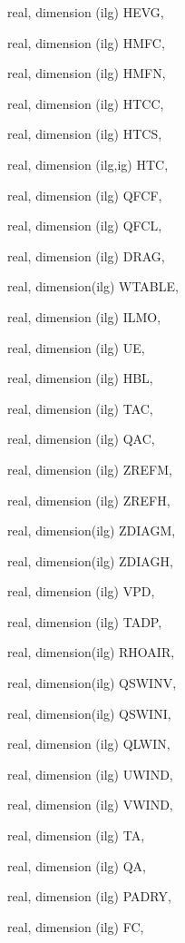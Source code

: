 {\begin{DoxyParamCaption}
\item[{real, dimension  (ilg)}]{H\+E\+V\+G, }
\item[{real, dimension  (ilg)}]{H\+M\+F\+C, }
\item[{real, dimension  (ilg)}]{H\+M\+F\+N, }
\item[{real, dimension  (ilg)}]{H\+T\+C\+C, }
\item[{real, dimension  (ilg)}]{H\+T\+C\+S, }
\item[{real, dimension   (ilg,ig)}]{H\+T\+C, }
\item[{real, dimension  (ilg)}]{Q\+F\+C\+F, }
\item[{real, dimension  (ilg)}]{Q\+F\+C\+L, }
\item[{real, dimension  (ilg)}]{D\+R\+A\+G, }
\item[{real, dimension(ilg)}]{W\+T\+A\+B\+L\+E, }
\item[{real, dimension  (ilg)}]{I\+L\+M\+O, }
\item[{real, dimension    (ilg)}]{U\+E, }
\item[{real, dimension   (ilg)}]{H\+B\+L, }
\item[{real, dimension   (ilg)}]{T\+A\+C, }
\item[{real, dimension   (ilg)}]{Q\+A\+C, }
\item[{real, dimension (ilg)}]{Z\+R\+E\+F\+M, }
\item[{real, dimension (ilg)}]{Z\+R\+E\+F\+H, }
\item[{real, dimension(ilg)}]{Z\+D\+I\+A\+G\+M, }
\item[{real, dimension(ilg)}]{Z\+D\+I\+A\+G\+H, }
\item[{real, dimension   (ilg)}]{V\+P\+D, }
\item[{real, dimension  (ilg)}]{T\+A\+D\+P, }
\item[{real, dimension(ilg)}]{R\+H\+O\+A\+I\+R, }
\item[{real, dimension(ilg)}]{Q\+S\+W\+I\+N\+V, }
\item[{real, dimension(ilg)}]{Q\+S\+W\+I\+N\+I, }
\item[{real, dimension (ilg)}]{Q\+L\+W\+I\+N, }
\item[{real, dimension (ilg)}]{U\+W\+I\+N\+D, }
\item[{real, dimension (ilg)}]{V\+W\+I\+N\+D, }
\item[{real, dimension    (ilg)}]{T\+A, }
\item[{real, dimension    (ilg)}]{Q\+A, }
\item[{real, dimension (ilg)}]{P\+A\+D\+R\+Y, }
\item[{real, dimension    (ilg)}]{F\+C, }

\end{DoxyParamCaption}}
